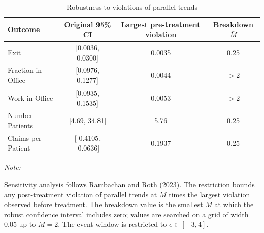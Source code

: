 \begin{table}[!h]
\centering
\caption{\label{tab:honest_breakdown}Robustness to violations of parallel trends}
\centering
\begin{threeparttable}
\begin{tabular}[t]{lccc}
\toprule
Outcome & Original 95\% CI & Largest pre-treatment violation & Breakdown $\bar{M}$\\
\midrule
Exit & {}[0.0036, 0.0300] & 0.0035 & 0.25\\
Fraction in Office & {}[0.0976, 0.1277] & 0.0044 & $>2$\\
Work in Office & {}[0.0935, 0.1535] & 0.0053 & $>2$\\
Number Patients & {}[4.69, 34.81] & 5.76 & 0.25\\
Claims per Patient & {}[-0.4105, -0.0636] & 0.1937 & 0.25\\
\bottomrule
\end{tabular}
\begin{tablenotes}
\item \textit{Note: } 
\item Sensitivity analysis follows Rambachan and Roth (2023). The restriction bounds any post-treatment violation of parallel trends at $\bar{M}$ times the largest violation observed before treatment. The breakdown value is the smallest $\bar{M}$ at which the robust confidence interval includes zero; values are searched on a grid of width 0.05 up to $\bar{M}=2$. The event window is restricted to $e \in [-3, 4]$.
\end{tablenotes}
\end{threeparttable}
\end{table}
